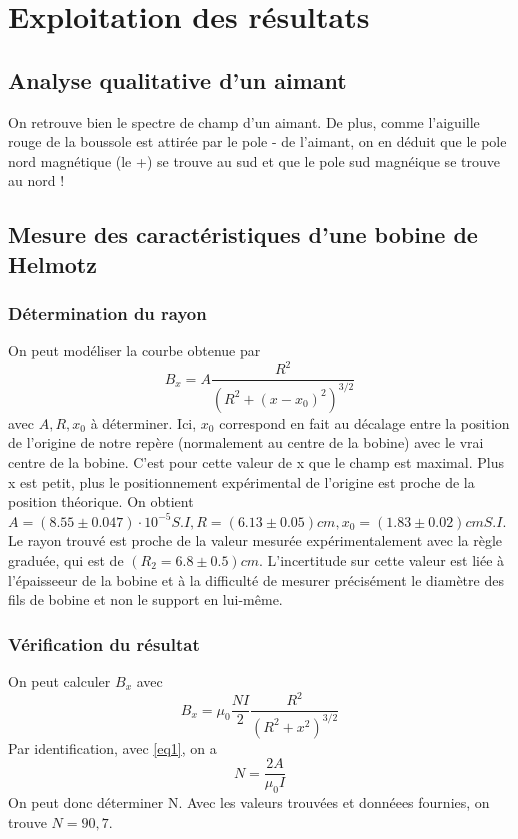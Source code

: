 \documentclass[a4paper,9pt,french]{scrartcl}
\begin{document}
\section{Exploitation des résultats}
\subsection{Analyse qualitative d'un aimant}

On retrouve bien le spectre de champ d'un aimant. De plus, comme l'aiguille rouge de la boussole est attirée par le pole - de l'aimant, on en déduit que le pole nord magnétique (le +) se trouve au sud et que le pole sud magnéique se trouve au nord !
\subsection{Mesure des caractéristiques d'une bobine de Helmotz}
\subsubsection{Détermination du rayon}
On peut modéliser la courbe obtenue par \begin{equation}B_x = A\frac{R^2}{(R^2+(x-x_0)^2)^{3/2}}\label{eq1}\end{equation} avec \(A, R, x_0\) à déterminer. Ici, \(x_0\) correspond en fait au décalage entre la position de l'origine de notre repère (normalement au centre de la bobine) avec le vrai centre de la bobine. C'est pour cette valeur de x que le champ est maximal. Plus x est petit, plus le positionnement expérimental de l'origine est proche de la position théorique.
On obtient \(A = (8.55\pm 0.047)\cdot 10^{-5} S.I, R = (6.13\pm0.05) cm, x_0=(1.83\pm0.02)cm S.I\). Le rayon trouvé est proche de la valeur mesurée expérimentalement avec la règle graduée, qui est de \((R_2 = 6.8\pm 0.5)cm\). L'incertitude sur cette valeur est liée à l'épaisseeur de la bobine et à la difficulté de mesurer précisément le diamètre des fils de bobine et non le support en lui-m\^eme.
\subsubsection{Vérification du résultat}
On peut calculer \(B_x\) avec
\begin{equation}
 B_x = \mu_0\frac{NI}{2}\frac{R^2}{(R^2+x^2)^{3/2}}
 \label{eq2}
\end{equation}
Par identification, avec \ref{eq1}, on a \[N = \frac{2A}{\mu_0I}\] On peut donc déterminer N. Avec les valeurs trouvées et donnéees fournies, on trouve \(N = 90,7\).
\end{document}
